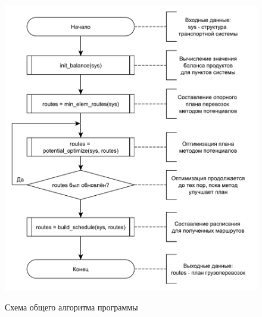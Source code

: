 \begin{figure}[h]
	\begin{center}
		{\includegraphics[scale=0.7, angle=0, page=1]{img/main_algorithm.pdf}}
		\caption{Схема общего алгоритма программы}
		\label{alg:main}
	\end{center}
\end{figure}

\pagebreak